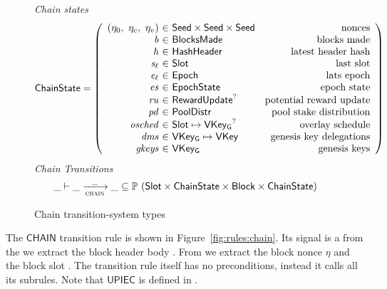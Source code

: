 \begin{figure}
  \emph{Chain states}
  \begin{equation*}
    \ChainState =
    \left(
      \begin{array}{r@{~\in~}lr}
        (\eta_0,~\eta_c,~\eta_v) & \Seed\times\Seed\times\Seed & \text{nonces} \\
        \var{b} & \BlocksMade & \text{blocks made} \\
        \var{h} & \HashHeader & \text{latest header hash} \\
        \var{s_\ell} & \Slot & \text{last slot} \\
        \var{e_\ell} & \Epoch & \text{lats epoch} \\
        \var{es} & \EpochState & \text{epoch state} \\
        \var{ru} & \RewardUpdate^? & \text{potential reward update} \\
        \var{pd} & \PoolDistr & \text{pool stake distribution} \\
        \var{osched} & \Slot\mapsto\VKeyGen^? & \text{overlay schedule} \\
        \var{dms} & \VKeyGen\mapsto\VKey & \text{genesis key delegations} \\
        \var{gkeys} & \VKeyGen & \text{genesis keys} \\
      \end{array}
    \right)
  \end{equation*}
  \emph{Chain Transitions}
  \begin{equation*}
    \_ \vdash \var{\_} \trans{chain}{\_} \var{\_} \subseteq
    \powerset (\Slot \times \ChainState \times \Block \times \ChainState)
  \end{equation*}
  \caption{Chain transition-system types}
  \label{fig:ts-types:chain}
\end{figure}

The $\mathsf{CHAIN}$ transition rule is shown in
Figure~\ref{fig:rules:chain}. Its signal is a  from the 
we extract the block header body . From  we extract the block
nonce $\eta$ and the block slot . The transition rule itself has no
preconditions, instead it calls all its subrules.
Note that $\mathsf{UPIEC}$ is defined in \cite{byron_ledger_spec}.

